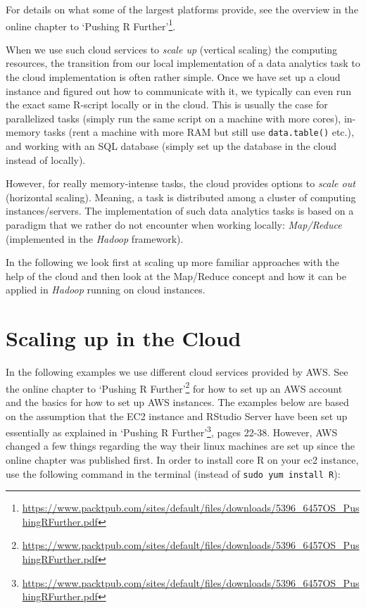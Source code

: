 \documentclass[
  12pt,
]{style/krantz}
\renewcommand{\href}[2]{#2\footnote{\url{#1}}}
\begin{document}
For details on what some of the largest platforms provide, see the overview in the online chapter to \citet{walkowiak_2016} \href{https://www.packtpub.com/sites/default/files/downloads/5396_6457OS_PushingRFurther.pdf}{`Pushing R Further'}.

When we use such cloud services to \emph{scale up} (vertical scaling) the computing resources, the transition from our local implementation of a data analytics task to the cloud implementation is often rather simple. Once we have set up a cloud instance and figured out how to communicate with it, we typically can even run the exact same R-script locally or in the cloud. This is usually the case for parallelized tasks (simply run the same script on a machine with more cores), in-memory tasks (rent a machine with more RAM but still use \texttt{data.table()} etc.), and working with an SQL database (simply set up the database in the cloud instead of locally).

However, for really memory-intense tasks, the cloud provides options to \emph{scale out} (horizontal scaling). Meaning, a task is distributed among a cluster of computing instances/servers. The implementation of such data analytics tasks is based on a paradigm that we rather do not encounter when working locally: \emph{Map/Reduce} (implemented in the \emph{Hadoop} framework).

In the following we look first at scaling up more familiar approaches with the help of the cloud and then look at the Map/Reduce concept and how it can be applied in \emph{Hadoop} running on cloud instances.

\hypertarget{scaling-up-in-the-cloud}{%
\section{Scaling up in the Cloud}\label{scaling-up-in-the-cloud}}

In the following examples we use different cloud services provided by AWS. See the online chapter to \citet{walkowiak_2016} \href{https://www.packtpub.com/sites/default/files/downloads/5396_6457OS_PushingRFurther.pdf}{`Pushing R Further'} for how to set up an AWS account and the basics for how to set up AWS instances. The examples below are based on the assumption that the EC2 instance and RStudio Server have been set up essentially as explained in \href{https://www.packtpub.com/sites/default/files/downloads/5396_6457OS_PushingRFurther.pdf}{`Pushing R Further'}, pages 22-38. However, AWS changed a few things regarding the way their linux machines are set up since the online chapter was published first. In order to install core R on your ec2 instance, use the following command in the terminal (instead of \texttt{sudo\ yum\ install\ R}):
\end{document}
